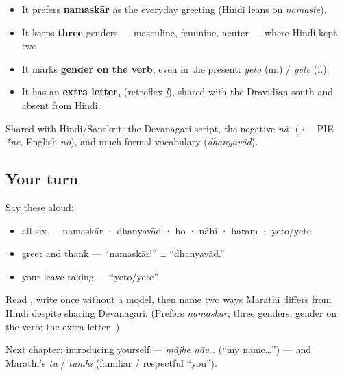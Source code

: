 \begin{grammarlens}[title={What you've built}]
\begin{itemize}
\raggedright
  \item It prefers \textbf{namaskār} as the everyday greeting (Hindi leans on \emph{namaste}).
  \item It keeps \textbf{three} genders — masculine, feminine, neuter — where Hindi kept two.
  \item It marks \textbf{gender on the verb}, even in the present: \emph{yeto} (m.) / \emph{yete} (f.).
  \item It has an \textbf{extra letter, } (retroflex \emph{ḷ}), shared with the Dravidian south and absent from Hindi.
\end{itemize}

Shared with Hindi/Sanskrit: the Devanagari script, the negative \emph{nā-} ($\leftarrow$ PIE \emph{*ne}, English \emph{no}), and much formal vocabulary (\emph{dhanyavād}).
\end{grammarlens}

\subsection*{Your turn}
Say these aloud:

\begin{itemize}
\raggedright
  \item all six — namaskār · dhanyavād · ho · nāhī · baraṃ · yeto/yete
  \item greet and thank — \textquotedblleft{}namaskār!\textquotedblright{} … \textquotedblleft{}dhanyavād.\textquotedblright{}
  \item your leave-taking — \textquotedblleft{}yeto/yete\textquotedblright{}
\end{itemize}

\begin{tcolorbox}[breakable,colback=teal!4,colframe=teal!35!black,title={Before you move on}]
Read \textbf{}, write \textbf{} once without a model, then name two ways Marathi differs from Hindi despite sharing Devanagari. (Prefers \emph{namaskār}; three genders; gender on the verb; the extra letter \emph{}.)

Next chapter: introducing yourself — \emph{mājhe nāv…} (\textquotedblleft{}my name…\textquotedblright{}) — and Marathi's \emph{tū} / \emph{tumhī} (familiar / respectful \textquotedblleft{}you\textquotedblright{}).
\end{tcolorbox}

